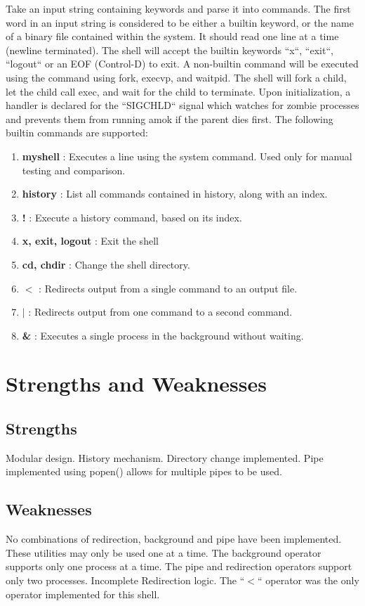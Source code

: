 \documentclass[letter,10pt]{article}
\begin{document}
Take an input string containing keywords and parse it into commands. The first word in an input string is considered to be either a builtin keyword, or the name of a binary file contained within the system.  It should read one line at a time (newline terminated). The shell will accept the builtin keywords ``x``, ``exit``, ``logout`` or an EOF (Control-D) to exit.  A non-builtin command will be executed using the command using fork, execvp, and waitpid. The shell will fork a child, let the child call exec, and wait for the child to terminate. Upon initialization, a handler is declared for the ``SIGCHLD`` signal which watches for zombie processes and prevents them from running amok if the parent dies first. The following builtin commands are supported:
\begin{enumerate}
	\item \textbf{myshell} : Executes a line using the system command. Used only for manual testing and comparison.
	\item \textbf{history} : List all commands contained in history, along with an index.
	\item \textbf{!} : Execute a history command, based on its index. 
	\item \textbf{x, exit, logout} : Exit the shell
	\item \textbf{cd, chdir} : Change the shell directory.
	\item \textbf{$<$} : Redirects output from a single command to an output file.
	\item \textbf{$|$} : Redirects output from one command to a second command.
	\item \textbf{\&} : Executes a single process in the background without waiting.
\end{enumerate}

\section*{Strengths and Weaknesses}
    \subsection*{Strengths}
        Modular design.
        History mechanism.
        Directory change implemented.
        Pipe implemented using popen() allows for multiple pipes to be used.
    \subsection*{Weaknesses}
        No combinations of redirection, background and pipe have been implemented. These utilities may only be used one at a time. The background operator supports only one process at a time. The pipe and redirection operators support only two processes.
        Incomplete Redirection logic. The ``$<$`` operator was the only operator implemented for this shell. 
\end{document}
